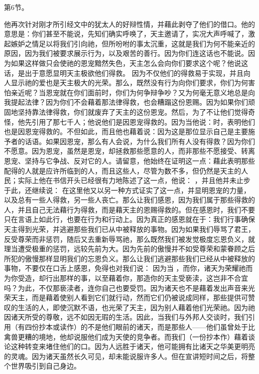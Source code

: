 第6节。\par

他再次针对刚才所引经文中的犹太人的好辩性情，并藉此剥夺了他们的借口。他的意思是：你们甚至不能说，先知们确实呼唤了，天主邀请了，实况大声呼喊了，激起嫉妒之情足以将我们引向祂，但所吩咐的事太沉重，这就是我们为何不能亲近的原因，因为我们被要求展示行为，以及艰苦的善行。因为你们连这话也不能说。因为如果这样做只会使祂的恩宠黯然失色，天主怎么会向你们要求这个呢？他说这话，是出于意愿显明天主极欲他们得救。 因为不仅他们的得救易于实现，并且向人显示祂的爱也是天主极大的光荣。那么，既然没有行为向你们要求，你们为何害怕亲近呢？当恩宠就在你们面前时，你们为何争辩争吵？又为何毫无意义地总是向我提起法律？因为你们不会藉着那法律得救，也会糟蹋这份恩赐。因为如果你们顽固地坚持靠法律得救，你们就废弃了天主的这份恩宠。然后，为了不让他们觉得奇怪，他先引用了那七千人；他说他们是因恩宠得救的。因为当他说：时，表明他们也是因恩宠得救的。不但如此，而且他也藉着说：因为这是那位显示自己是主要施予者的话语。如果因恩宠，那么有人会说，为什么我们所有人没有得救？因为你们不愿意。因为恩宠，虽然是恩宠，却拯救那些愿意的人，而非那些不愿接受、转离恩宠、坚持与它争战、反对它的人。请留意，他始终在证明这一点：藉此表明那些配得的人就是应许所临到的人，而且这些人，尽管为数不多，但仍然是天主的人民；实际上他在书信开头已经很有力地陈述了这一点，他说： ，并且他并未止步于此，还继续说：  在这里他又以另一种方式证实了这一点，并显明恩宠的力量，以及总有一些人得救，另一些人丧亡。那么让我们感恩，因为我们属于那些得救的人，并且自己无法藉行为得救，而是藉天主的恩赐得救的。但在感恩时，我们不要只在言语上如此行，也要在行为和行动上。因为真正的感恩就在于：我们行事确保天主得到光荣，并逃避那些我们已从中被释放的事物。因为如果我们辱骂了君王，反受尊荣而非惩罚，随后又去重新辱骂祂，那么既然我们被发觉极度忘恩负义，就理当遭受极重的惩罚，远较先前为大。因为先前的傲慢并不如受尊荣和蒙眷顾之后所犯的傲慢那样显明我们的忘恩负义。那么让我们逃避那些我们已经从中被释放的事物，不要仅在口舌上感恩，免得也对我们说：  因为当 ，而你，诸天为荣耀祂而为你受造，却行出那样的事，以至藉着你，那造你的天主受亵渎，这岂非不合宜吗？为此，不仅那亵渎者，连你自己也要受罚。因为诸天也不是藉着发出声音来光荣天主，而是藉着使别人看到它们就行动，然而它们仍被说成同样，那些提供可赞叹的生活的人，即使沉默不语，也光荣了天主，因为别人藉着他们光荣祂。因为祂因诸天所受的尊敬，远不如因无瑕的生活。因此，当我们与外邦人交谈时，我们引用（有四份抄本或读作）的不是他们眼前的诸天，而是那些人——他们虽曾处于比禽兽更糟的境地，他却说服他们成为天使的竞争者。而我们（一份抄本作）藉着谈论这种转变来堵住他们的口。因为人远胜于诸天，他可能拥有比诸天之华美更明亮的灵魂。因为诸天虽然长久可见，却未能说服许多人。但在宣讲短时间之后，将整个世界吸引到自己身边。 